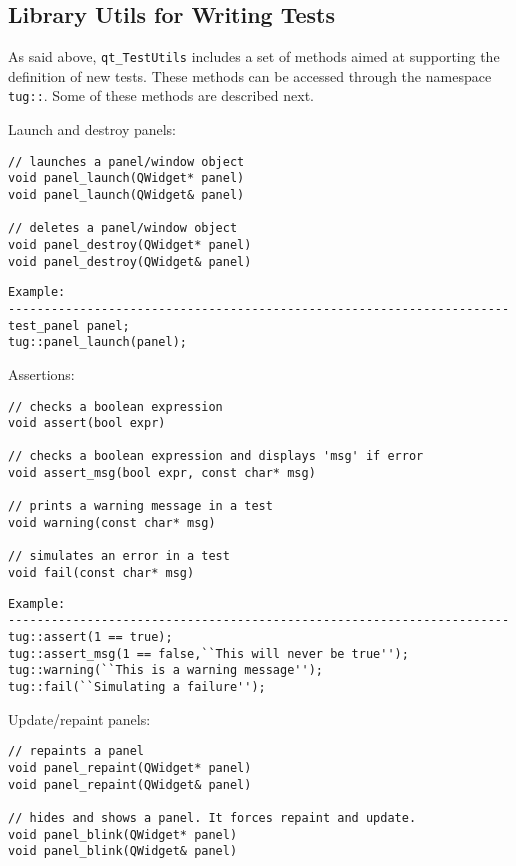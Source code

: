 
\subsection{Library Utils for Writing Tests}

As said above, {\tt qt\_TestUtils} includes a set of methods aimed at
supporting the definition of new tests. These methods can be accessed
through the namespace {\tt tug::}.
%
Some of these methods are described next.

\vspace{1ex}

Launch and destroy panels:
%
\begin{lstlisting}
// launches a panel/window object
void panel_launch(QWidget* panel)
void panel_launch(QWidget& panel)

// deletes a panel/window object
void panel_destroy(QWidget* panel)
void panel_destroy(QWidget& panel)
\end{lstlisting}

\begin{lstlisting}
Example:
----------------------------------------------------------------------
test_panel panel;
tug::panel_launch(panel);
\end{lstlisting}


Assertions:
%
\begin{lstlisting}
// checks a boolean expression
void assert(bool expr)

// checks a boolean expression and displays 'msg' if error
void assert_msg(bool expr, const char* msg)

// prints a warning message in a test
void warning(const char* msg)

// simulates an error in a test
void fail(const char* msg)
\end{lstlisting}

\begin{lstlisting}
Example:
----------------------------------------------------------------------
tug::assert(1 == true);
tug::assert_msg(1 == false,``This will never be true'');
tug::warning(``This is a warning message'');
tug::fail(``Simulating a failure'');
\end{lstlisting}


Update/repaint panels:
%
\begin{lstlisting}
// repaints a panel
void panel_repaint(QWidget* panel)
void panel_repaint(QWidget& panel)

// hides and shows a panel. It forces repaint and update.
void panel_blink(QWidget* panel)
void panel_blink(QWidget& panel)
\end{lstlisting}

